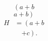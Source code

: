 \documentclass{article}
\begin{document}
\[ \left( a+b \right. \]
\[ \left. a+b \right) \]
\begin{align}
  H & = \left( a + b \right. \nonumber \\
    & \quad \left. + c \right).
\end{align}
\end{document}
